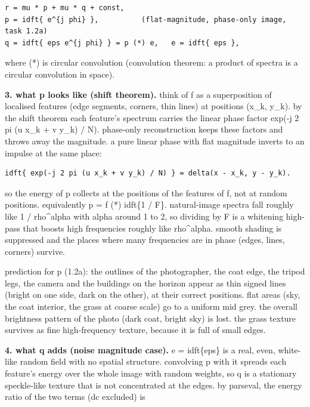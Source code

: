 \begin{verbatim}
r = mu * p + mu * q + const,
p = idft{ e^{j phi} },          (flat-magnitude, phase-only image, task 1.2a)
q = idft{ eps e^{j phi} } = p (*) e,   e = idft{ eps },
\end{verbatim}

where (*) is circular convolution (convolution theorem: a product of spectra is a circular convolution in space).

\textbf{3. what p looks like (shift theorem).} think of f as a superposition of localised features (edge segments, corners, thin lines) at positions (x\_k, y\_k). by the shift theorem each feature's spectrum carries the linear phase factor exp(-j 2 pi (u x\_k + v y\_k) / N). phase-only reconstruction keeps these factors and throws away the magnitude. a pure linear phase with flat magnitude inverts to an impulse at the same place:

\begin{verbatim}
idft{ exp(-j 2 pi (u x_k + v y_k) / N) } = delta(x - x_k, y - y_k).
\end{verbatim}

so the energy of p collects at the positions of the features of f, not at random positions. equivalently p = f (*) idft\{1 / \textbar{}F\textbar{}\}. natural-image spectra fall roughly like 1 / rho\textasciicircum{}alpha with alpha around 1 to 2, so dividing by \textbar{}F\textbar{} is a whitening high-pass that boosts high frequencies roughly like rho\textasciicircum{}alpha. smooth shading is suppressed and the places where many frequencies are in phase (edges, lines, corners) survive.

prediction for p (1.2a): the outlines of the photographer, the coat edge, the tripod legs, the camera and the buildings on the horizon appear as thin signed lines (bright on one side, dark on the other), at their correct positions. flat areas (sky, the coat interior, the grass at coarse scale) go to a uniform mid grey. the overall brightness pattern of the photo (dark coat, bright sky) is lost. the grass texture survives as fine high-frequency texture, because it is full of small edges.

\textbf{4. what q adds (noise magnitude case).} e = idft\{eps\} is a real, even, white-like random field with no spatial structure. convolving p with it spreads each feature's energy over the whole image with random weights, so q is a stationary speckle-like texture that is not concentrated at the edges. by parseval, the energy ratio of the two terms (dc excluded) is

